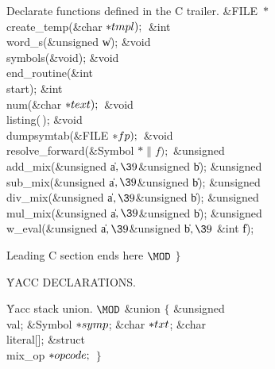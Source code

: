 Declarate functions defined in the C trailer.
\Y\B\&{FILE} ${}{*}{}$\\{create\_temp}(\&{char} ${}{*}\\{tmpl});{}$\6
\&{int} \\{word\_s}(\&{unsigned} \|w);\6
\&{void} \\{symbols}(\&{void});\6
\&{void} \\{end\_routine}(\&{int} \\{start});\6
\&{int} \\{num}(\&{char} ${}{*}\\{text});{}$\6
\&{void} \\{listing}(\,);\6
\&{void} \\{dumpsymtab}(\&{FILE} ${}{*}\\{fp});{}$\6
\&{void} \\{resolve\_forward}(\&{Symbol} ${}{*}\|f);{}$\6
\&{unsigned} \\{add\_mix}(\&{unsigned} \|a${},\39{}$\&{unsigned} \|b);\6
\&{unsigned} \\{sub\_mix}(\&{unsigned} \|a${},\39{}$\&{unsigned} \|b);\6
\&{unsigned} \\{div\_mix}(\&{unsigned} \|a${},\39{}$\&{unsigned} \|b);\6
\&{unsigned} \\{mul\_mix}(\&{unsigned} \|a${},\39{}$\&{unsigned} \|b);\6
\&{unsigned} \\{w\_eval}(\&{unsigned} \|a${},\39{}$\&{unsigned} \|b${},\39{}$%
\&{int} \|f);\par
\fi

Leading C section ends here
\Y\B$\MOD$ $\}{}$\par
\fi

\.{YACC} DECLARATIONS.

\fi

\.{Yacc} stack union.
\Y\B$\MOD$ \&{union} ${}\{{}$\1\6
\&{unsigned} \\{val};\6
\&{Symbol} ${}{*}\\{symp}{}$;\6
\&{char} ${}{*}\\{txt}{}$;\6
\&{char} \\{literal}[];\6
\&{struct} \\{mix\_op} ${}{*}\\{opcode};{}$\2\6
${}\}{}$\par
\fi

